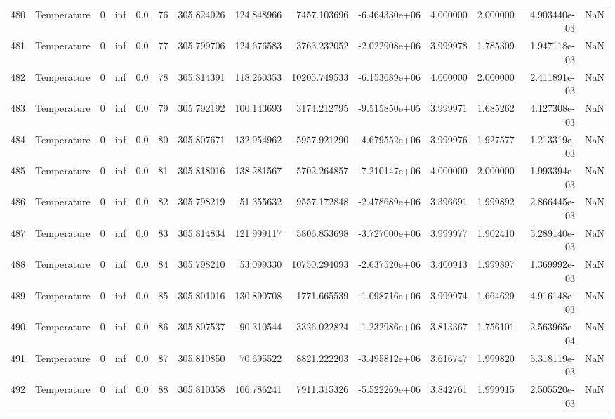 \begin{tabular}{llrrrrrrrrrrrr}
480 &  Temperature &       0 &  inf &  0.0 &   76 &  305.824026 &   124.848966 &    7457.103696 & -6.464330e+06 &  4.000000 &  2.000000 &  4.903440e-03 &      NaN \\
481 &  Temperature &       0 &  inf &  0.0 &   77 &  305.799706 &   124.676583 &    3763.232052 & -2.022908e+06 &  3.999978 &  1.785309 &  1.947118e-03 &      NaN \\
482 &  Temperature &       0 &  inf &  0.0 &   78 &  305.814391 &   118.260353 &   10205.749533 & -6.153689e+06 &  4.000000 &  2.000000 &  2.411891e-03 &      NaN \\
483 &  Temperature &       0 &  inf &  0.0 &   79 &  305.792192 &   100.143693 &    3174.212795 & -9.515850e+05 &  3.999971 &  1.685262 &  4.127308e-03 &      NaN \\
484 &  Temperature &       0 &  inf &  0.0 &   80 &  305.807671 &   132.954962 &    5957.921290 & -4.679552e+06 &  3.999976 &  1.927577 &  1.213319e-03 &      NaN \\
485 &  Temperature &       0 &  inf &  0.0 &   81 &  305.818016 &   138.281567 &    5702.264857 & -7.210147e+06 &  4.000000 &  2.000000 &  1.993394e-03 &      NaN \\
486 &  Temperature &       0 &  inf &  0.0 &   82 &  305.798219 &    51.355632 &    9557.172848 & -2.478689e+06 &  3.396691 &  1.999892 &  2.866445e-03 &      NaN \\
487 &  Temperature &       0 &  inf &  0.0 &   83 &  305.814834 &   121.999117 &    5806.853698 & -3.727000e+06 &  3.999977 &  1.902410 &  5.289140e-03 &      NaN \\
488 &  Temperature &       0 &  inf &  0.0 &   84 &  305.798210 &    53.099330 &   10750.294093 & -2.637520e+06 &  3.400913 &  1.999897 &  1.369992e-03 &      NaN \\
489 &  Temperature &       0 &  inf &  0.0 &   85 &  305.801016 &   130.890708 &    1771.665539 & -1.098716e+06 &  3.999974 &  1.664629 &  4.916148e-03 &      NaN \\
490 &  Temperature &       0 &  inf &  0.0 &   86 &  305.807537 &    90.310544 &    3326.022824 & -1.232986e+06 &  3.813367 &  1.756101 &  2.563965e-04 &      NaN \\
491 &  Temperature &       0 &  inf &  0.0 &   87 &  305.810850 &    70.695522 &    8821.222203 & -3.495812e+06 &  3.616747 &  1.999820 &  5.318119e-03 &      NaN \\
492 &  Temperature &       0 &  inf &  0.0 &   88 &  305.810358 &   106.786241 &    7911.315326 & -5.522269e+06 &  3.842761 &  1.999915 &  2.505520e-03 &      NaN \\

\end{tabular}
